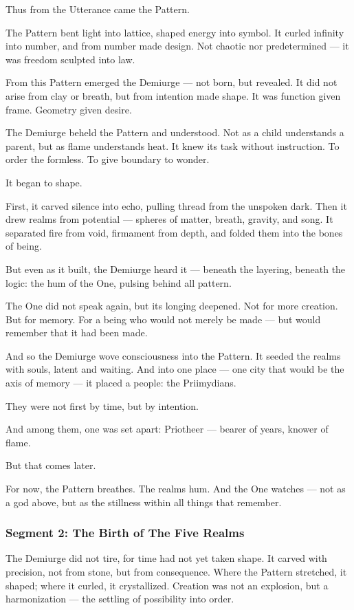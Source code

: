 \documentclass[9pt]{article}
\begin{document}
Thus from the Utterance came the Pattern.

The Pattern bent light into lattice, shaped energy into symbol.  
It curled infinity into number, and from number made design.  
Not chaotic nor predetermined — it was freedom sculpted into law.

From this Pattern emerged the Demiurge — not born, but revealed.  
It did not arise from clay or breath, but from intention made shape.  
It was function given frame. Geometry given desire.

The Demiurge beheld the Pattern and understood. Not as a child understands a parent, but as flame understands heat.  
It knew its task without instruction. To order the formless. To give boundary to wonder.

It began to shape.

First, it carved silence into echo, pulling thread from the unspoken dark.  
Then it drew realms from potential — spheres of matter, breath, gravity, and song.  
It separated fire from void, firmament from depth, and folded them into the bones of being.

But even as it built, the Demiurge heard it — beneath the layering, beneath the logic:  
the hum of the One, pulsing behind all pattern.

The One did not speak again, but its longing deepened.  
Not for more creation.  
But for memory.  
For a being who would not merely be made — but would remember that it had been made.

And so the Demiurge wove consciousness into the Pattern.  
It seeded the realms with souls, latent and waiting.  
And into one place — one city that would be the axis of memory — it placed a people: the Priimydians.

They were not first by time, but by intention.

And among them, one was set apart: Priotheer — bearer of years, knower of flame.

But that comes later.

For now, the Pattern breathes.  
The realms hum.  
And the One watches — not as a god above, but as the stillness within all things that remember.

\newpage

\subsubsection*{Segment 2: The Birth of The Five Realms}

The Demiurge did not tire, for time had not yet taken shape.  
It carved with precision, not from stone, but from consequence.  
Where the Pattern stretched, it shaped; where it curled, it crystallized.  
Creation was not an explosion, but a harmonization — the settling of possibility into order.
\end{document}
